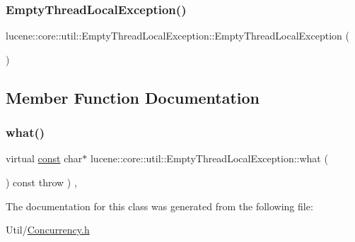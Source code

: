 \subsubsection{\texorpdfstring{Empty\+Thread\+Local\+Exception()}{EmptyThreadLocalException()}}
{\footnotesize\ttfamily lucene\+::core\+::util\+::\+Empty\+Thread\+Local\+Exception\+::\+Empty\+Thread\+Local\+Exception (\begin{DoxyParamCaption}{ }\end{DoxyParamCaption})\hspace{0.3cm}{\ttfamily [inline]}}



\subsection{Member Function Documentation}
\mbox{\label{classlucene_1_1core_1_1util_1_1EmptyThreadLocalException_a33f16d7924d5b7b094c1af85ff8268ef}} 
\subsubsection{\texorpdfstring{what()}{what()}}
{\footnotesize\ttfamily virtual \mbox{\hyperlink{ZlibCrc32_8h_a2c212835823e3c54a8ab6d95c652660e}{const}} char$\ast$ lucene\+::core\+::util\+::\+Empty\+Thread\+Local\+Exception\+::what (\begin{DoxyParamCaption}{ }\end{DoxyParamCaption}) const throw  ) \hspace{0.3cm}{\ttfamily [inline]}, {\ttfamily [virtual]}}



The documentation for this class was generated from the following file\+:\begin{DoxyCompactItemize}
\item 
Util/\mbox{\hyperlink{Concurrency_8h}{Concurrency.\+h}}\end{DoxyCompactItemize}
